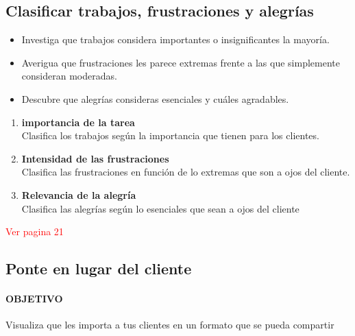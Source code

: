 \documentclass[11pt]{book}
\begin{document}
\subsection{Clasificar trabajos, frustraciones y alegrías}
\begin{itemize}
\item Investiga que trabajos considera importantes o insignificantes la mayoría.
\item Averigua que frustraciones les parece extremas frente a las que simplemente consideran moderadas.
\item Descubre que alegrías consideras esenciales y cuáles agradables.
\end{itemize}
\begin{enumerate}
\item \textbf{importancia de la tarea}\\
Clasifica los trabajos según la importancia que tienen para los clientes.
\item \textbf{Intensidad de las frustraciones}\\
Clasifica las frustraciones en función de lo extremas que son a ojos del cliente.
\item \textbf{Relevancia de la alegría}\\
Clasifica las alegrías según lo esenciales que sean a ojos del cliente
\end{enumerate}
\textcolor{red}{Ver pagina 21}
\subsection{Ponte en lugar del cliente}
\paragraph{OBJETIVO}
Visualiza que les importa a tus clientes en un formato que se pueda compartir
\end{document}

